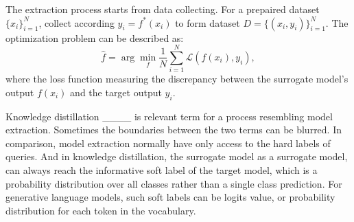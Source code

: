 The extraction process starts from data collecting. For a prepaired dataset$\{x_i\}^N_{i=1}$, collect according $y_i=f^*(x_i)$ to form dataset $D =\{(x_i,y_i)\}^N_{i=1}$. The optimization problem can be described as:
\begin{equation}
\hat{f} = \arg\min_f \frac{1}{N} \sum_{i=1}^N \mathcal{L}(f(x_i), y_i),
\end{equation}
where the loss function measuring the discrepancy between the surrogate model's output $f(x_i)$ and the target output $y_i$.

Knowledge distillation ____ is relevant term  for a process resembling model extraction. Sometimes the boundaries between the two terms can be blurred. In comparison, model extraction normally have only access to the hard labels of queries. And in knowledge distillation, the surrogate model as a surrogate model, can always reach the informative soft label of the target model, which is a probability distribution over all classes rather than a single class prediction. For generative language models, such soft labels can be logits value, or probability distribution for each token in the vocabulary.